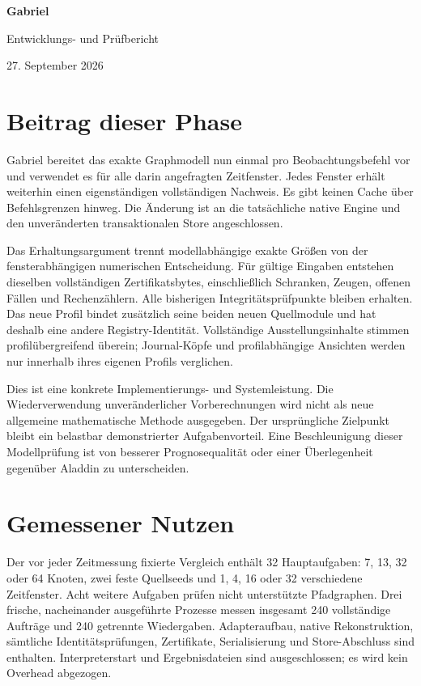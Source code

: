 \documentclass[11pt,a4paper]{article}
\begin{document}
\begin{center}
{\LARGE\bfseries Gabriel}\par\vspace{5pt}
{\large Entwicklungs- und Prüfbericht}\par\vspace{5pt}
27. September 2026
\end{center}
\section*{Beitrag dieser Phase}
Gabriel bereitet das exakte Graphmodell nun einmal pro Beobachtungsbefehl vor und verwendet es für alle darin angefragten Zeitfenster. Jedes Fenster erhält weiterhin einen eigenständigen vollständigen Nachweis. Es gibt keinen Cache über Befehlsgrenzen hinweg. Die Änderung ist an die tatsächliche native Engine und den unveränderten transaktionalen Store angeschlossen.

Das Erhaltungsargument trennt modellabhängige exakte Größen von der fensterabhängigen numerischen Entscheidung. Für gültige Eingaben entstehen dieselben vollständigen Zertifikatsbytes, einschließlich Schranken, Zeugen, offenen Fällen und Rechenzählern. Alle bisherigen Integritätsprüfpunkte bleiben erhalten. Das neue Profil bindet zusätzlich seine beiden neuen Quellmodule und hat deshalb eine andere Registry-Identität. Vollständige Ausstellungsinhalte stimmen profilübergreifend überein; Journal-Köpfe und profilabhängige Ansichten werden nur innerhalb ihres eigenen Profils verglichen.

Dies ist eine konkrete Implementierungs- und Systemleistung. Die Wiederverwendung unveränderlicher Vorberechnungen wird nicht als neue allgemeine mathematische Methode ausgegeben. Der ursprüngliche Zielpunkt bleibt ein belastbar demonstrierter Aufgabenvorteil. Eine Beschleunigung dieser Modellprüfung ist von besserer Prognosequalität oder einer Überlegenheit gegenüber Aladdin zu unterscheiden.

\section*{Gemessener Nutzen}
Der vor jeder Zeitmessung fixierte Vergleich enthält 32 Hauptaufgaben: 7, 13, 32 oder 64 Knoten, zwei feste Quellseeds und 1, 4, 16 oder 32 verschiedene Zeitfenster. Acht weitere Aufgaben prüfen nicht unterstützte Pfadgraphen. Drei frische, nacheinander ausgeführte Prozesse messen insgesamt 240 vollständige Aufträge und 240 getrennte Wiedergaben. Adapteraufbau, native Rekonstruktion, sämtliche Identitätsprüfungen, Zertifikate, Serialisierung und Store-Abschluss sind enthalten. Interpreterstart und Ergebnisdateien sind ausgeschlossen; es wird kein Overhead abgezogen.
\end{document}
